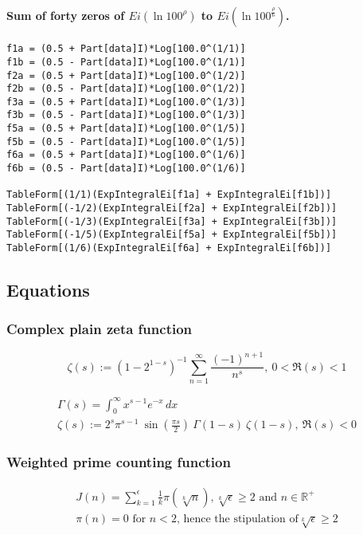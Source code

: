 \paragraph{Sum of forty zeros of $Ei(\ln 100^{\rho})$ to $Ei(\ln 100^\frac{\rho}{6})$.} \label{ap:MathematicaSumOfEi}
\begin{verbatim}
f1a = (0.5 + Part[data]I)*Log[100.0^(1/1)]
f1b = (0.5 - Part[data]I)*Log[100.0^(1/1)]
f2a = (0.5 + Part[data]I)*Log[100.0^(1/2)]
f2b = (0.5 - Part[data]I)*Log[100.0^(1/2)]
f3a = (0.5 + Part[data]I)*Log[100.0^(1/3)]
f3b = (0.5 - Part[data]I)*Log[100.0^(1/3)]
f5a = (0.5 + Part[data]I)*Log[100.0^(1/5)]
f5b = (0.5 - Part[data]I)*Log[100.0^(1/5)]
f6a = (0.5 + Part[data]I)*Log[100.0^(1/6)]
f6b = (0.5 - Part[data]I)*Log[100.0^(1/6)]

TableForm[(1/1)(ExpIntegralEi[f1a] + ExpIntegralEi[f1b])]
TableForm[(-1/2)(ExpIntegralEi[f2a] + ExpIntegralEi[f2b])]
TableForm[(-1/3)(ExpIntegralEi[f3a] + ExpIntegralEi[f3b])]
TableForm[(-1/5)(ExpIntegralEi[f5a] + ExpIntegralEi[f5b])]
TableForm[(1/6)(ExpIntegralEi[f6a] + ExpIntegralEi[f6b])]
\end{verbatim}


\subsection{Equations} \label{Equations}
\subsubsection{Complex plain zeta function}
\begin{equation} \label{eq:Appendix-RiemannModifiedSum}
\zeta(s) := (1-2^{1-s})^{-1} \sum_{n=1}^{\infty} \frac{(-1)^{n+1}}{n^s}, \ 0 < \Re(s) < 1
\end{equation}

\begin{equation} \label{eq:Appendix-RiemannFunctional}
\begin{split}
\Gamma(s) = \int_0^\infty x^{s-1} e^{-x}\, dx \\
\zeta(s) := 2^s\pi^{s-1}\ \sin\left(\frac{\pi s}{2}\right)\ \Gamma(1-s)\ \zeta(1-s), \ \Re(s) < 0
\end{split}
\end{equation}

\subsubsection{Weighted prime counting function}
\begin{equation}\label{eq:Appendix-Jn}
\begin{split}
	J(n) = \sum_{k=1}^{\epsilon} \frac{1}{k}\pi(\sqrt[k]{n}), \sqrt[k]{\epsilon} \geq 2 \text{ and } n \in \mathbb{R^+} \\
	\pi(n) = 0 \text{ for $n < 2$, hence the stipulation of} \sqrt[k]{\epsilon} \geq 2
\end{split}
\end{equation}

